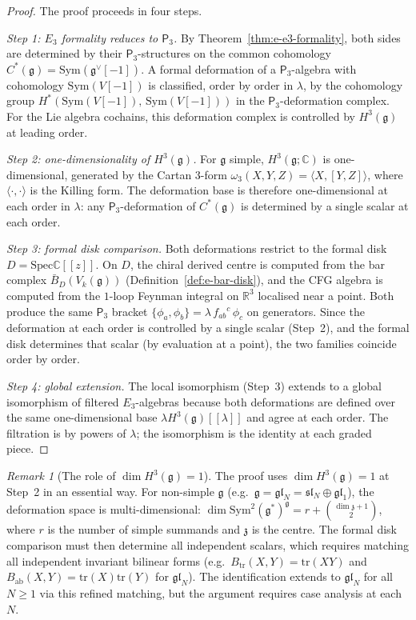 \documentclass[11pt,reqno]{amsart}
\theoremstyle{definition}
\theoremstyle{remark}
\newtheorem{remark}[theorem]{Remark}
\providecommand{\fg}{\mathfrak{g}}
\providecommand{\Ethree}{E_3}
\providecommand{\Pthree}{\mathsf{P}_3}
\providecommand{\barB}{\bar{B}}
\providecommand{\bC}{\mathbb{C}}
\providecommand{\bR}{\mathbb{R}}
\providecommand{\Sym}{\mathrm{Sym}}
\providecommand{\Spec}{\mathrm{Spec}}
\begin{document}
\begin{proof}
The proof proceeds in four steps.

\emph{Step 1: $\Ethree$ formality reduces to $\Pthree$.}
By Theorem~\ref{thm:e-e3-formality}, both sides are
determined by their $\Pthree$-structures on the common
cohomology $C^*(\fg) = \Sym(\fg^\vee[-1])$. A formal
deformation of a $\Pthree$-algebra with cohomology
$\Sym(V[-1])$ is classified, order by order in $\lambda$,
by the cohomology group
$H^*(\Sym(V[-1]),\, \Sym(V[-1]))$ in the $\Pthree$-deformation
complex. For the Lie algebra cochains, this deformation complex
is controlled by $H^3(\fg)$ at leading order.

\emph{Step 2: one-dimensionality of $H^3(\fg)$.}
For $\fg$ simple, $H^3(\fg;\bC)$ is one-dimensional, generated
by the Cartan $3$-form
$\omega_3(X,Y,Z) = \langle X, [Y,Z]\rangle$, where
$\langle\cdot,\cdot\rangle$ is the Killing form. The
deformation base is therefore one-dimensional at each order
in $\lambda$: any $\Pthree$-deformation of
$C^*(\fg)$ is determined by a single scalar at each order.

\emph{Step 3: formal disk comparison.}
Both deformations restrict to the formal disk
$D = \Spec\bC[[z]]$. On $D$, the chiral derived centre is
computed from the bar complex $\barB_D(V_k(\fg))$
(Definition~\ref{def:e-bar-disk}), and the CFG algebra
is computed from the $1$-loop Feynman integral on $\bR^3$
localised near a point. Both produce the same $\Pthree$
bracket $\{\phi_a, \phi_b\} = \lambda\,f_{ab}{}^c\,\phi_c$
on generators. Since the deformation at each order is
controlled by a single scalar (Step~2), and the formal disk
determines that scalar (by evaluation at a point), the two
families coincide order by order.

\emph{Step 4: global extension.}
The local isomorphism (Step~3) extends to a global isomorphism
of filtered $\Ethree$-algebras because both deformations are
defined over the same one-dimensional base
$\lambda H^3(\fg)[[\lambda]]$ and agree at each order. The
filtration is by powers of $\lambda$; the isomorphism is the
identity at each graded piece.
\end{proof}

\begin{remark}[The role of $\dim H^3(\fg) = 1$]
\label{rem:e-h3-role}
The proof uses $\dim H^3(\fg) = 1$ at Step~2 in an essential
way. For non-simple $\fg$ (e.g.\
$\fg = \mathfrak{gl}_N = \mathfrak{sl}_N \oplus
\mathfrak{gl}_1$), the deformation space is
multi-dimensional: $\dim \Sym^2(\fg^*)^\fg = r +
\binom{\dim\mathfrak{z}+1}{2}$, where $r$ is the number of
simple summands and $\mathfrak{z}$ is the centre. The formal
disk comparison must then determine all independent scalars,
which requires matching all independent invariant bilinear forms
(e.g.\ $B_{\mathrm{tr}}(X,Y) = \mathrm{tr}(XY)$ and
$B_{\mathrm{ab}}(X,Y) = \mathrm{tr}(X)\mathrm{tr}(Y)$ for
$\mathfrak{gl}_N$). The identification extends to
$\mathfrak{gl}_N$ for all $N \ge 1$ via this refined matching,
but the argument requires case analysis at each $N$.
\end{remark}
\end{document}
